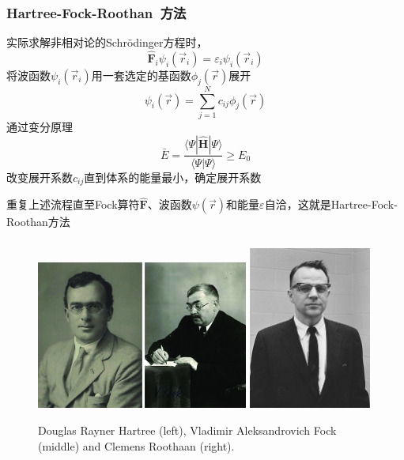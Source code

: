 {\frame
{
	\frametitle{\textrm{Hartree-Fock-Roothan~}方法}
	实际求解非相对论的\textrm{Schr\"odinger}方程时，
	$$\hat{\mathbf F}_i\psi_i(\vec r_i)=\varepsilon_i\psi_i(\vec r_i)$$
	将波函数$\psi_i(\vec r_i)$用一套选定的基函数$\phi_j(\vec r)$展开
	$$\psi_i(\vec r)=\sum_{j=1}^Nc_{ij}\phi_j(\vec r)$$
	通过变分原理
	$$\bar E=\dfrac{\langle\Psi|\hat{\mathbf H}|\Psi\rangle}{\langle\Psi|\Psi\rangle}\geqslant E_0$$
	改变展开系数$c_{ij}$直到体系的能量最小，确定展开系数

	重复上述流程直至\textrm{Fock}算符$\hat{\mathbf F}$、波函数$\psi(\vec r)$和能量$\varepsilon$自洽，这就是\textrm{Hartree-Fock-Roothan}方法
}

\frame
{
	\frametitle{}
\begin{figure}[h!]
\centering
\includegraphics[height=0.45\textwidth,width=0.62\textwidth,viewport=0 0 42 30,clip]{Figures/Hartree_Fock.jpg}
\includegraphics[height=0.45\textwidth,width=0.36\textwidth,viewport=0 0 250 305,clip]{Figures/Clemens_Roothaan.jpg}
\caption{\tiny\textrm{Douglas Rayner Hartree (left), Vladimir Aleksandrovich Fock (middle) and Clemens Roothaan (right).}}
\label{HF}
\end{figure}
}

}
